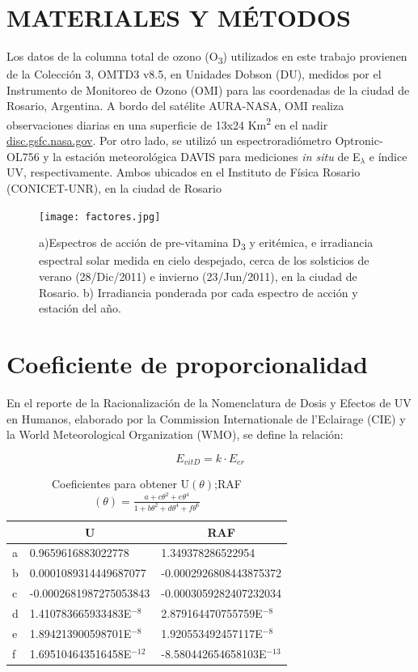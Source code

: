 \documentclass[10pt,twocolumn]{article}
\begin{document}
\section{MATERIALES Y MÉTODOS}
Los datos de la columna total de ozono (O\textsubscript{3}) utilizados en este trabajo provienen de la Colección 3, OMTD3 v8.5, en Unidades Dobson (DU), medidos por el Instrumento de Monitoreo de Ozono (OMI) para las coordenadas de la ciudad de Rosario, Argentina. A bordo del satélite AURA-NASA, OMI realiza observaciones diarias en una superficie de 13x24 Km\textsuperscript{2} en el nadir \href{(disc.gsfc.nasa.gov)}{\url{disc.gsfc.nasa.gov}}. Por otro lado, se utilizó un espectroradiómetro Optronic-OL756 y la estación meteorológica DAVIS para mediciones \emph{in situ} de E$_\lambda$ e índice UV, respectivamente. Ambos ubicados en el Instituto de Física Rosario (CONICET-UNR), en la ciudad de Rosario

\begin{figure}[ht]
  \centering
  \texttt{[image: factores.jpg]}
  \caption{a)Espectros de acción de pre-vitamina D\textsubscript{3} y eritémica, e irradiancia espectral solar medida en cielo despejado, cerca de los solsticios de verano (28/Dic/2011) e invierno (23/Jun/2011), en la ciudad de Rosario. b) Irradiancia ponderada por cada espectro de acción y estación del año.}
  \label{fig:factores}
\end{figure}

\section{Coeficiente de proporcionalidad}
En el reporte de la Racionalización de la Nomenclatura de Dosis y Efectos de UV en Humanos\cite{UVDoses}, elaborado por la Commission Internationale de l’Eclairage (CIE) y la World Meteorological Organization (WMO), se define la relación:

\begin{equation}
  E_{vitD} = k \cdot E_{er}
  \label{ee:CIE}
\end{equation}
\begin{table}[ht]
  \centering
  \caption{Coeficientes\cite{Herman2010} para obtener U$(\theta)$;RAF $(\theta)= \frac{a+c\theta^2+e\theta^4}{1+b\theta^2+d\theta^4+f\theta^6}$}
  \label{table::parametros}
  \begin{tabular}{lll}
    \hline
      & \multicolumn{1}{c}{U}      & \multicolumn{1}{c}{RAF}     \\ \hline
    a & 0.9659616883022778         & 1.349378286522954           \\
    b & 0.0001089314449687077      & -0.0002926808443875372      \\
    c & -0.0002681987275053843     & -0.0003059282407232034      \\
    d & 1.410783665933483E$^{-8 }$ & 2.879164470755759E$^{-8}$   \\
    e & 1.894213900598701E$^{-8 }$ & 1.920553492457117E$^{-8}$   \\
    f & 1.695104643516458E$^{-12}$ & -8.580442654658103E$^{-13}$ \\ \hline
  \end{tabular}
\end{table}
\end{document}

